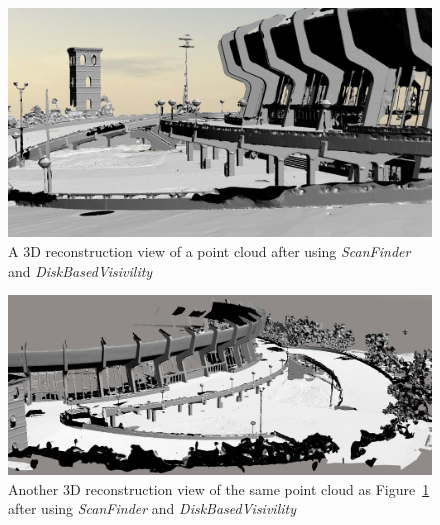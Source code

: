 \begin{figure}
  \centering
  \includegraphics[scale=0.35]{img/complete-result1.png}
  \caption{A 3D reconstruction view of a point cloud after using \emph{ScanFinder} and \emph{DiskBasedVisivility}}
  \label{fig:complete-result1}
\end{figure}
\begin{figure}
  \centering
  \includegraphics[scale=0.35]{img/complete-result2.png}
    \caption{Another 3D reconstruction view of the same point cloud as Figure~\ref{fig:complete-result1} after using \emph{ScanFinder} and \emph{DiskBasedVisivility}}
  \label{fig:complete-result2}
\end{figure}

